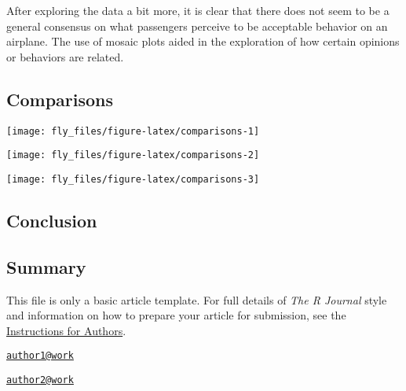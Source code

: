 After exploring the data a bit more, it is clear that there does not
seem to be a general consensus on what passengers perceive to be
acceptable behavior on an airplane. The use of mosaic plots aided in the
exploration of how certain opinions or behaviors are related.

\subsection{Comparisons}\label{comparisons}

\begin{Schunk}


\begin{center}\texttt{[image: fly\_files/figure-latex/comparisons-1]} \end{center}



\begin{center}\texttt{[image: fly\_files/figure-latex/comparisons-2]} \end{center}



\begin{center}\texttt{[image: fly\_files/figure-latex/comparisons-3]} \end{center}

\end{Schunk}

\subsection{Conclusion}\label{conclusion}

\subsection{Summary}\label{summary}

This file is only a basic article template. For full details of
\emph{The R Journal} style and information on how to prepare your
article for submission, see the
\href{https://journal.r-project.org/share/author-guide.pdf}{Instructions
for Authors}.



\address{%
Haley Jeppson\\
Iowa State University\\
line 1\\ line 2\\
}
\href{mailto:author1@work}{\nolinkurl{author1@work}}

\address{%
Heike Hofmann\\
Iowa State University\\
line 1\\ line 2\\
}
\href{mailto:author2@work}{\nolinkurl{author2@work}}

